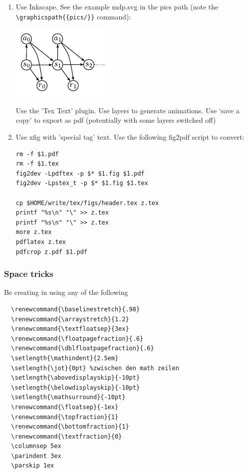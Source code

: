 \begin{enumerate}

\item Use Inkscape. See the example mdp.svg in the pics path (note
the \verb+\graphicspath{{pics/}}+ command):

\centerline{\includegraphics[scale=.5]{mdp}}


  Use the 'Tex Text' plugin. Use layers to generate animations. Use
  `save a copy' to export as pdf (potentially with some layers
  switched off)

\item Use xfig with 'special tag' text. Use the following fig2pdf script to
  convert:

\begin{code}
\begin{verbatim}
rm -f $1.pdf
rm -f $1.tex
fig2dev -Lpdftex -p $* $1.fig $1.pdf
fig2dev -Lpstex_t -p $* $1.fig $1.tex

cp $HOME/write/tex/figs/header.tex z.tex
printf "%s\n" "\" >> z.tex
printf "%s\n" "\" >> z.tex
more z.tex
pdflatex z.tex
pdfcrop z.pdf $1.pdf
\end{verbatim}
\end{code}
\end{enumerate}



\subsubsection{Space tricks}

Be creating in using any of the following\\
\begin{code}
\begin{verbatim}
  \renewcommand{\baselinestretch}{.98}
  \renewcommand{\arraystretch}{1.2}
  \renewcommand{\textfloatsep}{3ex}
  \renewcommand{\floatpagefraction}{.6}
  \renewcommand{\dblfloatpagefraction}{.6}
  \setlength{\mathindent}{2.5em}
  \setlength{\jot}{0pt} %zwischen den math zeilen
  \setlength{\abovedisplayskip}{-10pt}
  \setlength{\belowdisplayskip}{-10pt}
  \setlength{\mathsurround}{-10pt}
  \renewcommand{\floatsep}{-1ex}
  \renewcommand{\topfraction}{1}
  \renewcommand{\bottomfraction}{1}
  \renewcommand{\textfraction}{0}
  \columnsep 5ex
  \parindent 3ex
  \parskip 1ex
\end{verbatim}
\end{code}

